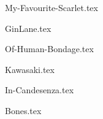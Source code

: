 \begin{songs}{}

  {My-Favourite-Scarlet.tex}
  \sclearpage
  
  {GinLane.tex}
  \sclearpage

  {Of-Human-Bondage.tex}
  \sclearpage
    
  {Kawasaki.tex}
  \sclearpage
  
  {In-Candesenza.tex}
  \sclearpage

  {Bones.tex}

\end{songs}

